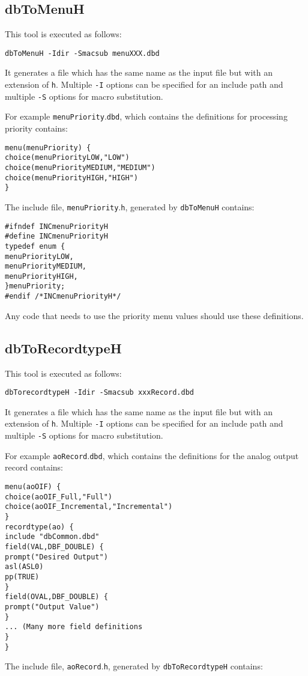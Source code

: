 \subsection{dbToMenuH}

This tool is executed as follows:

\begin{verbatim}dbToMenuH -Idir -Smacsub menuXXX.dbd
\end{verbatim}It generates a file which has the same name as the input file but with an extension of \verb|h|. Multiple \verb|-I| options can be 
specified for an include path and multiple \verb|-S| options for macro substitution.

For example \verb|menuPriority|.\verb|dbd|, which contains the definitions for processing priority contains:

\begin{verbatim}menu(menuPriority) {
choice(menuPriorityLOW,"LOW")
choice(menuPriorityMEDIUM,"MEDIUM")
choice(menuPriorityHIGH,"HIGH")
}
\end{verbatim}The include file, \verb|menuPriority|.\verb|h|, generated by \verb|dbToMenuH| contains:

\begin{verbatim}#ifndef INCmenuPriorityH
#define INCmenuPriorityH
typedef enum {
menuPriorityLOW,
menuPriorityMEDIUM,
menuPriorityHIGH,
}menuPriority;
#endif /*INCmenuPriorityH*/

\end{verbatim}Any code that needs to use the priority menu values should use these definitions.

\subsection{dbToRecordtypeH}

This tool is executed as follows:

\begin{verbatim}dbTorecordtypeH -Idir -Smacsub xxxRecord.dbd
\end{verbatim}It generates a file which has the same name as the input file but with an extension of \verb|h|. Multiple \verb|-I| options can be 
specified for an include path and multiple \verb|-S| options for macro substitution.

For example \verb|aoRecord|.\verb|dbd|, which contains the definitions for the analog output record contains:

\begin{verbatim}menu(aoOIF) {
choice(aoOIF_Full,"Full")
choice(aoOIF_Incremental,"Incremental")
}
recordtype(ao) {
include "dbCommon.dbd"
field(VAL,DBF_DOUBLE) {
prompt("Desired Output")
asl(ASL0)
pp(TRUE)
}
field(OVAL,DBF_DOUBLE) {
prompt("Output Value")
}
... (Many more field definitions
}
}
\end{verbatim}The include file, \verb|aoRecord|.\verb|h|, generated by \verb|dbToRecordtypeH| contains:

